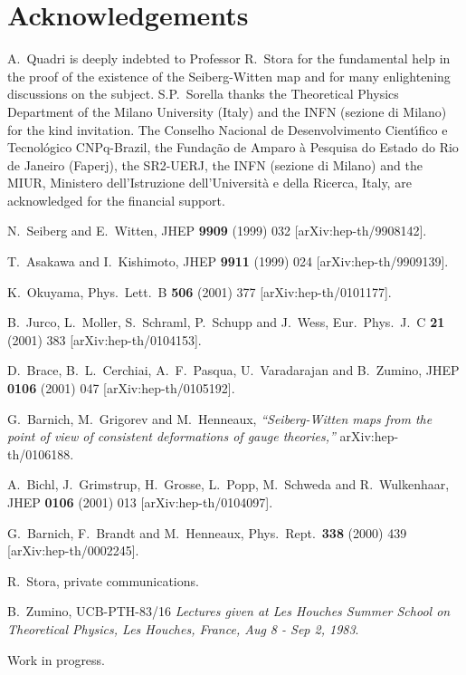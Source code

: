 \documentclass[a4paper,12pt]{article}
\begin{document}
\section*{Acknowledgements}

A.~Quadri is deeply indebted to Professor R.~Stora for the fundamental help
in the proof of the existence of the Seiberg-Witten map and for many
 enlightening discussions on the subject.
S.P.~Sorella thanks the Theoretical Physics Department of the Milano University
(Italy) and the INFN (sezione di Milano) for the kind invitation.
The Conselho Nacional de Desenvolvimento
Cient\'{\i}fico e Tecnol\'{o}gico CNPq-Brazil, the Funda{\c {c}}{\~{a}}o de
Amparo {\`{a}} Pesquisa do Estado do Rio de Janeiro (Faperj), the SR2-UERJ,
the INFN (sezione di Milano) and the MIUR, Ministero dell'Istruzione
 dell'Universit\`a e della Ricerca, Italy, are acknowledged for the
financial support.

\begin{thebibliography}{99}

N.~Seiberg and E.~Witten,
JHEP {\bf 9909} (1999) 032
[arXiv:hep-th/9908142].

T.~Asakawa and I.~Kishimoto,
JHEP {\bf 9911} (1999) 024
[arXiv:hep-th/9909139].

K.~Okuyama,
Phys.\ Lett.\ B {\bf 506} (2001) 377
[arXiv:hep-th/0101177].

B.~Jurco, L.~Moller, S.~Schraml, P.~Schupp and J.~Wess,
Eur.\ Phys.\ J.\ C {\bf 21} (2001) 383
[arXiv:hep-th/0104153].

D.~Brace, B.~L.~Cerchiai, A.~F.~Pasqua, U.~Varadarajan and B.~Zumino,
JHEP {\bf 0106} (2001) 047
[arXiv:hep-th/0105192].

G.~Barnich, M.~Grigorev and M.~Henneaux,
{\em ``Seiberg-Witten maps from the point of view of consistent deformations  of gauge theories,''}
arXiv:hep-th/0106188.

A.~Bichl, J.~Grimstrup, H.~Grosse, L.~Popp, M.~Schweda and R.~Wulkenhaar,
JHEP {\bf 0106} (2001) 013
[arXiv:hep-th/0104097].

G.~Barnich, F.~Brandt and M.~Henneaux,
Phys.\ Rept.\  {\bf 338} (2000) 439
[arXiv:hep-th/0002245].

R.~Stora, private communications.

B.~Zumino,
UCB-PTH-83/16
{\it Lectures given at Les Houches Summer School on Theoretical Physics, Les Houches, France, Aug 8 - Sep 2, 1983}.

Work in progress.

\end{thebibliography}
\end{document}
